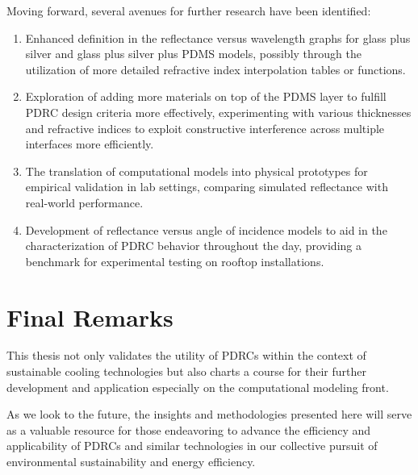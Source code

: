 Moving forward, several avenues for further research have been identified:

\begin{enumerate}
    \item Enhanced definition in the reflectance versus wavelength graphs for glass plus silver and glass plus silver plus PDMS models, possibly through the utilization of more detailed refractive index interpolation tables or functions.
    \item Exploration of adding more materials on top of the PDMS layer to fulfill PDRC design criteria more effectively, experimenting with various thicknesses and refractive indices to exploit constructive interference across multiple interfaces more efficiently.
    \item The translation of computational models into physical prototypes for empirical validation in lab settings, comparing simulated reflectance with real-world performance.
    \item Development of reflectance versus angle of incidence models to aid in the characterization of PDRC behavior throughout the day, providing a benchmark for experimental testing on rooftop installations.
\end{enumerate}

\section{Final Remarks}

This thesis not only validates the utility of PDRCs within the context of sustainable cooling technologies but also charts a course for their further development and application especially on the computational modeling front.

As we look to the future, the insights and methodologies presented here will serve as a valuable resource for those endeavoring to advance the efficiency and applicability of PDRCs and similar technologies in our collective pursuit of environmental sustainability and energy efficiency.